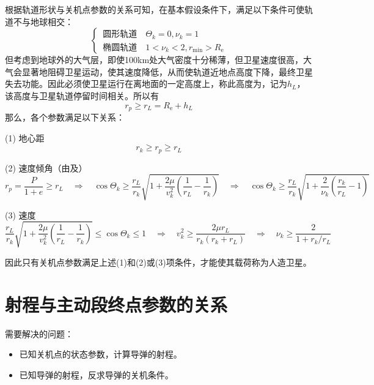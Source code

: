 
\sssection[人造卫星条件]

根据轨道形状与关机点参数的关系可知，在基本假设条件下，满足以下条件可使轨道不与地球相交：
\begin{equation}
	\begin{cases}
		\, \mbox{圆形轨道}\quad \varTheta_k = 0 , \nu_k = 1\\
		\, \mbox{椭圆轨道}\quad 1 < \nu_k < 2, r_{\min} > R_{\text{e}}
	\end{cases}
\end{equation}
但考虑到地球外的大气层，即使100km处大气密度十分稀薄，但卫星速度很高，大气会显著地阻碍卫星运动，使其速度降低，从而使轨道近地点高度下降，最终卫星失去功能。因此必须使卫星运行在离地面的一定高度上，称此高度为，记为$h_L$，该高度与卫星轨道停留时间相关。所以有
\begin{equation}
	r_p \ge r_L = R_{\text{e}} + h_L
\end{equation}
那么，各个参数满足以下关系：

(1) 地心距
\begin{equation*}
	r_k \ge r_p \ge r_L
\end{equation*}

(2) 速度倾角（由\peref[e]及\peref[P]）
\begin{equation*}
	r_p = \dfrac{P}{1 + e} \ge r_L \quad \Rightarrow \quad \cos \varTheta_k \ge \dfrac{r_L}{r_k} \sqrt{1 + \dfrac{2 \mu}{v_k^2}\left(\dfrac{1}{r_L} - \dfrac{1}{r_k}\right)} \quad \Rightarrow \quad \cos \varTheta_k \ge \dfrac{r_L}{r_k} \sqrt{1 + \dfrac{2}{\nu_k}\left(\dfrac{r_k}{r_L} - 1\right)} 
\end{equation*}

(3) 速度
\begin{equation*}
	\dfrac{r_L}{r_k} \sqrt{1 + \dfrac{2 \mu}{v_k^2}\left(\dfrac{1}{r_L} - \dfrac{1}{r_k}\right)} \le \cos \varTheta_k \le 1 \quad \Rightarrow \quad v_k^2 \ge \dfrac{2 \mu r_L}{r_k(r_k + r_L)}  \quad \Rightarrow \quad \nu_k \ge \dfrac{2}{1 + r_k/r_L}
\end{equation*}


因此只有关机点参数满足上述(1)和(2)或(3)项条件，才能使其载荷称为人造卫星。

\section{射程与主动段终点参数的关系}
\noindent 需要解决的问题：\vspace*{-0.5em}
\begin{itemize}
	\item 已知关机点的状态参数，计算导弹的射程。\vspace*{-0.3em}
	\item 已知导弹的射程，反求导弹的关机条件。
\end{itemize}

